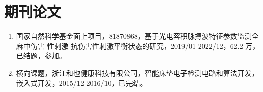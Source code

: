 {    \section*{期刊论文}
    \begin{enumerate}
        \item 国家自然科学基金面上项目，81870868，基于光电容积脉搏波特征参数监测全麻中伤害
        性刺激-抗伤害性刺激平衡状态的研究，2019/01-2022/12，62.2 万，已结题，参加。
        \item 横向课题，浙江和也健康科技有限公司，智能床垫电子检测电路和算法开发，嵌入式开发，2015/12-2016/10，已完结。
    \end{enumerate}
}